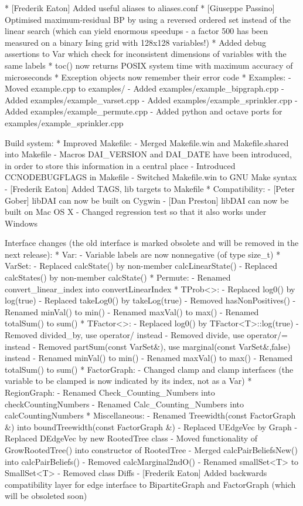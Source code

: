 \begin{DoxyVerbInclude}
* [Frederik Eaton] Added useful aliases to aliases.conf
* [Giuseppe Passino] Optimised maximum-residual BP by using a reversed ordered
  set instead of the linear search (which can yield enormous speedups - a
  factor 500 has been measured on a binary Ising grid with 128x128 variables!)
* Added debug assertions to Var which check for inconsistent dimensions of
  variables with the same labels
* toc() now returns POSIX system time with maximum accuracy of microseconds
* Exception objects now remember their error code
* Examples:
  - Moved example.cpp to examples/
  - Added examples/example_bipgraph.cpp
  - Added examples/example_varset.cpp
  - Added examples/example_sprinkler.cpp
  - Added examples/example_permute.cpp
  - Added python and octave ports for examples/example_sprinkler.cpp

Build system:
* Improved Makefile:
  - Merged Makefile.win and Makefile.shared into Makefile
  - Macros DAI_VERSION and DAI_DATE have been introduced,
    in order to store this information in a central place
  - Introduced CCNODEBUGFLAGS in Makefile
  - Switched Makefile.win to GNU Make syntax
  - [Frederik Eaton] Added TAGS, lib targets to Makefile
* Compatibility:
  - [Peter Gober] libDAI can now be built on Cygwin
  - [Dan Preston] libDAI can now be built on Mac OS X
  - Changed regression test so that it also works under Windows

Interface changes (the old interface is marked obsolete and will be removed in the next release):
* Var:
  - Variable labels are now nonnegative (of type size_t)
* VarSet:
  - Replaced calcState() by non-member calcLinearState()
  - Replaced calcStates() by non-member calcState()
* Permute:
  - Renamed convert_linear_index into convertLinearIndex
* TProb<>:
  - Replaced log0() by log(true)
  - Replaced takeLog0() by takeLog(true)
  - Removed hasNonPositives()
  - Renamed minVal() to min()
  - Renamed maxVal() to max()
  - Renamed totalSum() to sum()
* TFactor<>:
  - Replaced log0() by TFactor<T>::log(true)
  - Removed divided_by, use operator/ instead
  - Removed divide, use operator/= instead
  - Removed partSum(const VarSet&), use marginal(const VarSet&,false) instead
  - Renamed minVal() to min()
  - Renamed maxVal() to max()
  - Renamed totalSum() to sum()
* FactorGraph:
  - Changed clamp and clamp interfaces (the variable to be
    clamped is now indicated by its index, not as a Var)
* RegionGraph:
  - Renamed Check_Counting_Numbers into checkCountingNumbers
  - Renamed Calc_Counting_Numbers into calcCountingNumbers
* Miscellaneous:
  - Renamed Treewidth(const FactorGraph &) into boundTreewidth(const FactorGraph &)
  - Replaced UEdgeVec by Graph
  - Replaced DEdgeVec by new RootedTree class
  - Moved functionality of GrowRootedTree() into constructor of RootedTree
  - Merged calcPairBeliefsNew() into calcPairBeliefs()
  - Removed calcMarginal2ndO()
  - Renamed smallSet<T> to SmallSet<T>
  - Removed class Diffs
  - [Frederik Eaton] Added backwards compatibility layer for edge interface to
    BipartiteGraph and FactorGraph (which will be obsoleted soon)


\end{DoxyVerbInclude}
